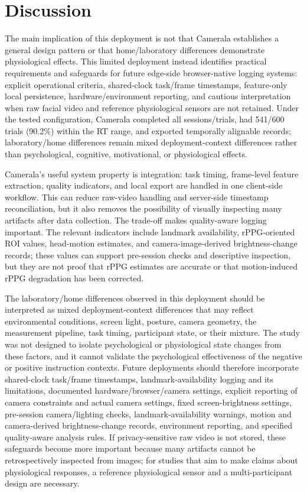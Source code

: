 \documentclass[dvipdfmx]{ehis}
\begin{document}
\section{Discussion}

The main implication of this deployment is not that Camerala establishes a general design pattern or that home/laboratory differences demonstrate physiological effects.
This limited deployment instead identifies practical requirements and safeguards for future edge-side browser-native logging systems: explicit operational criteria, shared-clock task/frame timestamps, feature-only local persistence, hardware/environment reporting, and cautious interpretation when raw facial video and reference physiological sensors are not retained.
Under the tested configuration, Camerala completed all sessions/trials, had 541/600 trials (90.2\%) within the RT range, and exported temporally alignable records; laboratory/home differences remain mixed deployment-context differences rather than psychological, cognitive, motivational, or physiological effects.

Camerala's useful system property is integration: task timing, frame-level feature extraction, quality indicators, and local export are handled in one client-side workflow.
This can reduce raw-video handling and server-side timestamp reconciliation, but it also removes the possibility of visually inspecting many artifacts after data collection.
The trade-off makes quality-aware logging important.
The relevant indicators include landmark availability, rPPG-oriented ROI values, head-motion estimates, and camera-image-derived brightness-change records; these values can support pre-session checks and descriptive inspection, but they are not proof that rPPG estimates are accurate or that motion-induced rPPG degradation has been corrected.

The laboratory/home differences observed in this deployment should be interpreted as mixed deployment-context differences that may reflect environmental conditions, screen light, posture, camera geometry, the measurement pipeline, task timing, participant state, or their mixture.
The study was not designed to isolate psychological or physiological state changes from these factors, and it cannot validate the psychological effectiveness of the negative or positive instruction contexts.
Future deployments should therefore incorporate shared-clock task/frame timestamps, landmark-availability logging and its limitations, documented hardware/browser/camera settings, explicit reporting of camera constraints and actual camera settings, fixed screen-brightness settings, pre-session camera/lighting checks, landmark-availability warnings, motion and camera-derived brightness-change records, environment reporting, and specified quality-aware analysis rules.
If privacy-sensitive raw video is not stored, these safeguards become more important because many artifacts cannot be retrospectively inspected from images; for studies that aim to make claims about physiological responses, a reference physiological sensor and a multi-participant design are necessary.
\end{document}
